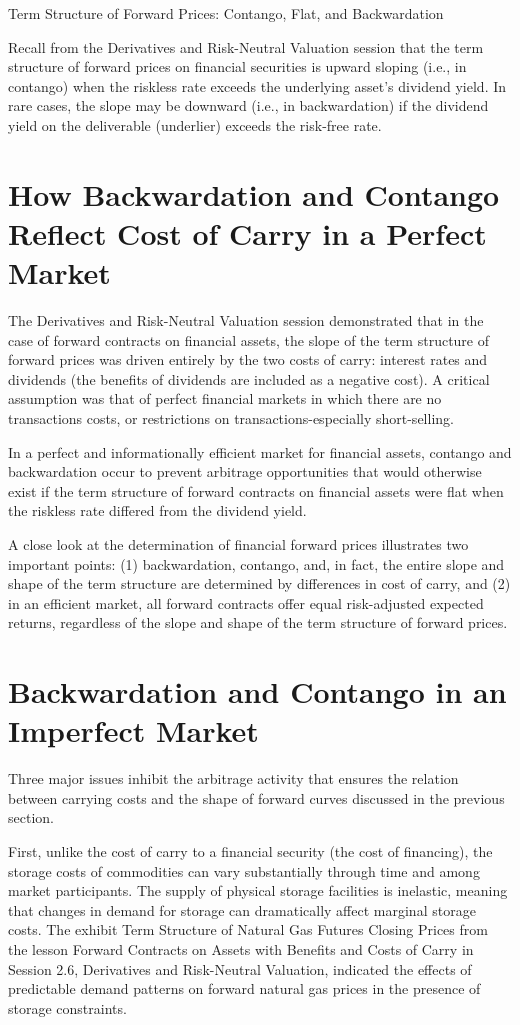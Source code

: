 \documentclass[11pt]{article}
\begin{document}
Term Structure of Forward Prices: Contango, Flat, and Backwardation

Recall from the Derivatives and Risk-Neutral Valuation session that the term structure of forward prices on financial securities is upward sloping (i.e., in contango) when the riskless rate exceeds the underlying asset's dividend yield. In rare cases, the slope may be downward (i.e., in backwardation) if the dividend yield on the deliverable (underlier) exceeds the risk-free rate.

\section*{How Backwardation and Contango Reflect Cost of Carry in a Perfect Market}
The Derivatives and Risk-Neutral Valuation session demonstrated that in the case of forward contracts on financial assets, the slope of the term structure of forward prices was driven entirely by the two costs of carry: interest rates and dividends (the benefits of dividends are included as a negative cost). A critical assumption was that of perfect financial markets in which there are no transactions costs, or restrictions on transactions-especially short-selling.

In a perfect and informationally efficient market for financial assets, contango and backwardation occur to prevent arbitrage opportunities that would otherwise exist if the term structure of forward contracts on financial assets were flat when the riskless rate differed from the dividend yield.

A close look at the determination of financial forward prices illustrates two important points: (1) backwardation, contango, and, in fact, the entire slope and shape of the term structure are determined by differences in cost of carry, and (2) in an efficient market, all forward contracts offer equal risk-adjusted expected returns, regardless of the slope and shape of the term structure of forward prices.

\section*{Backwardation and Contango in an Imperfect Market}
Three major issues inhibit the arbitrage activity that ensures the relation between carrying costs and the shape of forward curves discussed in the previous section.

First, unlike the cost of carry to a financial security (the cost of financing), the storage costs of commodities can vary substantially through time and among market participants. The supply of physical storage facilities is inelastic, meaning that changes in demand for storage can dramatically affect marginal storage costs. The exhibit Term Structure of Natural Gas Futures Closing Prices from the lesson Forward Contracts on Assets with Benefits and Costs of Carry in Session 2.6, Derivatives and Risk-Neutral Valuation, indicated the effects of predictable demand patterns on forward natural gas prices in the presence of storage constraints.
\end{document}
